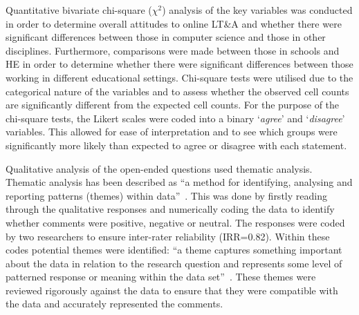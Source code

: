 \documentclass[conference]{IEEEtran}
\begin{document}
Quantitative bivariate chi-square ($\chi^2$) analysis of the key
variables was conducted in order to determine overall attitudes to
online LT\&A and whether there were significant differences between
those in computer science and those in other disciplines. Furthermore,
comparisons were made between those in schools and HE in order to
determine whether there were significant differences between those
working in different educational settings. Chi-square tests were
utilised due to the categorical nature of the variables and to assess
whether the observed cell counts are significantly different from the
expected cell counts. For the purpose of the chi-square tests, the
Likert scales were coded into a binary `{\emph{agree}}' and
`{\emph{disagree}}' variables. This allowed for ease of interpretation
and to see which groups were significantly more likely than expected
to agree or disagree with each statement.


Qualitative analysis of the open-ended questions used thematic
analysis. Thematic analysis has been described as ``a method for
identifying, analysing and reporting patterns (themes) within
data''~\cite{braun+clarke:2006}. This was done by firstly reading
through the qualitative responses and numerically coding the data to
identify whether comments were positive, negative or neutral. The
responses were coded by two researchers to ensure inter-rater
reliability (IRR=0.82). Within these codes potential themes were
identified: ``a theme captures something important about the data in
relation to the research question and represents some level of
patterned response or meaning within the data
set''~\cite[p.82]{braun+clarke:2006}. These themes were reviewed
rigorously against the data to ensure that they were compatible with
the data and accurately represented the comments.
\end{document}

